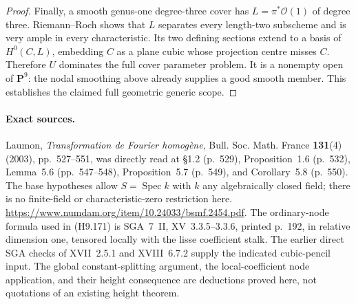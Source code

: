 \begin{proof}
Finally, a smooth genus-one degree-three cover has
$L=\pi^*\mathcal O(1)$ of degree three. Riemann--Roch shows
that $L$ separates every length-two subscheme and is very
ample in every characteristic. Its two defining sections
extend to a basis of $H^0(C,L)$, embedding $C$ as a plane
cubic whose projection centre misses $C$. Therefore $U$
dominates the full cover parameter problem. It is a
nonempty open of $\mathbf P^9$: the nodal smoothing above
already supplies a good smooth member. This establishes
the claimed full geometric generic scope.
\end{proof}

\paragraph{Exact sources.}
Laumon, \emph{Transformation de Fourier homog\`ene},
Bull. Soc. Math. France \textbf{131}(4) (2003),
pp.~527--551, was directly read at \S1.2 (p.~529),
Proposition~1.6 (p.~532), Lemma~5.6 (pp.~547--548),
Proposition~5.7 (p.~549), and Corollary~5.8 (p.~550).
The base hypotheses allow $S=\operatorname{Spec}k$ with
$k$ any algebraically closed field; there is no finite-field
or characteristic-zero restriction here.
\url{https://www.numdam.org/item/10.24033/bsmf.2454.pdf}.
The ordinary-node formula used in (H9.171) is SGA~7~II,
XV~3.3.5--3.3.6, printed p.~192, in relative dimension
one, tensored locally with the lisse coefficient stalk.
The earlier direct SGA checks of XVII~2.5.1 and
XVIII~6.7.2 supply the indicated cubic-pencil input.
The global constant-splitting argument, the local-coefficient
node application, and their height consequence are deductions
proved here, not quotations of an existing height theorem.
